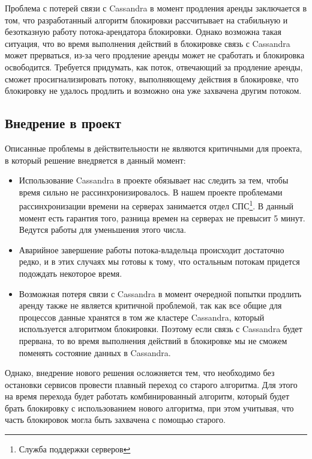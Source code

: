Проблема с потерей связи с Cassandra в момент продления аренды заключается в том, что разработанный алгоритм блокировки рассчитывает на стабильную и безотказную работу потока-арендатора блокировки. Однако возможна такая ситуация, что во время выполнения действий в блокировке связь с Cassandra может прерваться, из-за чего продление аренды может не сработать и блокировка освободится. Требуется придумать, как поток, отвечающий за продление аренды, сможет просигнализировать потоку, выполняющему действия в блокировке, что блокировку не удалось продлить и возможно она уже захвачена другим потоком.

\subsection{Внедрение в проект}

Описанные проблемы в действительности не являются критичными для проекта, в который решение внедряется в данный момент: 

\begin{itemize}
	\item Использование Cassandra в проекте обязывает нас следить за тем, чтобы время сильно не рассинхронизировалось. В нашем проекте проблемами рассинхронизации времени на серверах занимается отдел СПС\footnote{Служба поддержки серверов}. В данный момент есть гарантия того, разница времен на серверах не превысит 5 минут. Ведутся работы для уменьшения этого числа.

	\item Аварийное завершение работы потока-владельца происходит достаточно редко, и в этих случаях мы готовы к тому, что остальным потокам придется подождать некоторое время.

	\item Возможная потеря связи с Cassandra в момент очередной попытки продлить аренду также не является критичной проблемой, так как все общие для процессов данные хранятся в том же кластере Cassandra, который используется алгоритмом блокировки. Поэтому если связь с Cassandra будет прервана, то во время выполнения действий в блокировке мы не сможем поменять состояние данных в Cassandra. 
\end{itemize}

Однако, внедрение нового решения осложняется тем, что необходимо без остановки сервисов провести плавный переход со старого алгоритма. Для этого на время перехода будет работать комбинированный алгоритм, который будет брать блокировку с использованием нового алгоритма, при этом учитывая, что часть блокировок могла быть захвачена с помощью старого.
